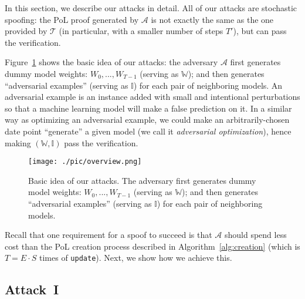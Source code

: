 \documentclass[conference]{IEEEtran}
\newcommand{\Prov}{\mathcal{T}\xspace}
\newcommand{\Adv}{\mathcal{A}\xspace}
\newcommand{\WWW}{\mathbb{W}\xspace}
\newcommand{\III}{\mathbb{I}\xspace}
\newcommand{\fig}{\textrm{Figure}\xspace}
\begin{document}
In this section, we describe our {attacks\EndAccSupp{}} in detail. 
All of our {attacks\EndAccSupp{}} are stochastic spoofing:
the PoL proof generated by $\Adv$ is not exactly the same as the one provided by $\Prov$ (in particular, with a smaller number of steps $T'$), but can pass the verification. 

\fig~\ref{fig:overview} shows the {basic\EndAccSupp{}} idea of our attacks: the {adversary\EndAccSupp{}} $\Adv$ first generates dummy model weights: $W_0, ..., W_{T-1}$ (serving as $\WWW$); and then generates ``adversarial examples'' (serving as $\III$) for each pair of neighboring models.
An {adversarial\EndAccSupp{}} example is an instance added with small and intentional {perturbations\EndAccSupp{}} so that a machine {learning\EndAccSupp{}} model will make a false {prediction\EndAccSupp{}} on it. 
In a {similar\EndAccSupp{}} way as optimizing an {adversarial\EndAccSupp{}} example, we could make an arbitrarily-chosen {date\EndAccSupp{}} point ``generate'' a given model (we call it {\em adversarial optimization}), hence making $(\WWW, \III)$ pass the verification. 


\begin{figure}[htb]
    \centering
    \texttt{[image: ./pic/overview.png]}
    \caption{Basic idea of our attacks. 
    The adversary first generates dummy model weights: $W_0, ..., W_{T-1}$ (serving as $\WWW$); and then generates ``adversarial examples'' (serving as $\III$) for each pair of neighboring models.}
    \label{fig:overview}
\end{figure}

{Recall\EndAccSupp{}} that one requirement for a {spoof\EndAccSupp{}} to succeed is that $\Adv$ should spend less cost than 
the PoL {creation\EndAccSupp{}} process described in Algorithm~\ref{alg:creation} (which is $T=E\cdot S$ {times\EndAccSupp{}} of \texttt{update}).
Next, we show how we {achieve\EndAccSupp{}} this.


\subsection{Attack~I}
\end{document}
